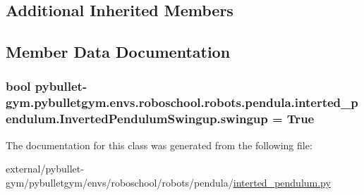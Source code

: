 \subsection*{Additional Inherited Members}


\subsection{Member Data Documentation}
\subsubsection[{\texorpdfstring{swingup}{swingup}}]{\setlength{\rightskip}{0pt plus 5cm}bool pybullet-\/gym.\+pybulletgym.\+envs.\+roboschool.\+robots.\+pendula.\+interted\+\_\+pendulum.\+Inverted\+Pendulum\+Swingup.\+swingup = True\hspace{0.3cm}{\ttfamily [static]}}\hypertarget{classpybullet-gym_1_1pybulletgym_1_1envs_1_1roboschool_1_1robots_1_1pendula_1_1interted__pendulum_1_1_inverted_pendulum_swingup_a050551faec422c49791d1d600ba246d7}{}\label{classpybullet-gym_1_1pybulletgym_1_1envs_1_1roboschool_1_1robots_1_1pendula_1_1interted__pendulum_1_1_inverted_pendulum_swingup_a050551faec422c49791d1d600ba246d7}


The documentation for this class was generated from the following file\+:\begin{DoxyCompactItemize}
\item 
external/pybullet-\/gym/pybulletgym/envs/roboschool/robots/pendula/\hyperlink{interted__pendulum_8py}{interted\+\_\+pendulum.\+py}\end{DoxyCompactItemize}
